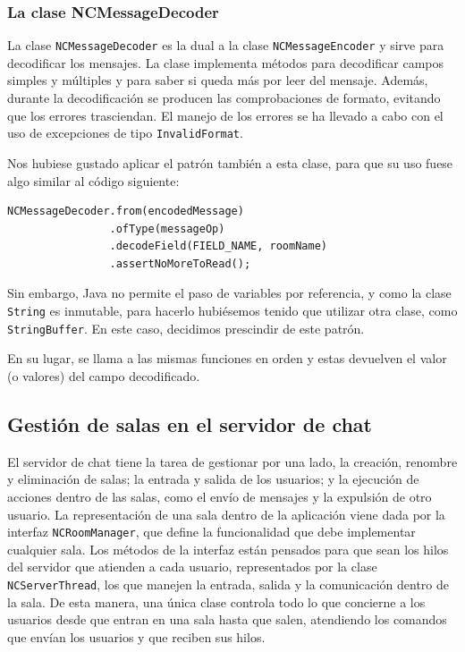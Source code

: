 

\subsubsection*{La clase NCMessageDecoder}
La clase \lstinline!NCMessageDecoder! es la dual a la clase \lstinline!NCMessageEncoder! y sirve para decodificar los mensajes. La clase implementa métodos para decodificar campos simples y múltiples y para saber si queda más por leer del mensaje. Además, durante la decodificación se producen las comprobaciones de formato, evitando que los errores trasciendan. El manejo de los errores se ha llevado a cabo con el uso de excepciones de tipo \lstinline!InvalidFormat!.

Nos hubiese gustado aplicar el patrón  también a esta clase, para que su uso fuese algo similar al código siguiente:

\begin{lstlisting}[style=JavaStyle]
NCMessageDecoder.from(encodedMessage)
                .ofType(messageOp)
                .decodeField(FIELD_NAME, roomName)
                .assertNoMoreToRead();
\end{lstlisting}

Sin embargo, Java no permite el paso de variables por referencia, y como la clase \lstinline!String! es inmutable, para hacerlo hubiésemos tenido que utilizar otra clase, como \lstinline!StringBuffer!. En este caso, decidimos prescindir de este patrón.

En su lugar, se llama a las mismas funciones en orden y estas devuelven el valor (o valores) del campo decodificado.

%

\subsection{Gestión de salas en el servidor de chat}
El servidor de chat tiene la tarea de gestionar por una lado, la creación, renombre y eliminación de salas; la entrada y salida de los usuarios; y la ejecución de acciones dentro de las salas, como el envío de mensajes y la expulsión de otro usuario. La representación de una sala dentro de la aplicación viene dada por la interfaz \lstinline!NCRoomManager!, que define la funcionalidad que debe implementar cualquier sala. Los métodos de la interfaz están pensados para que sean los hilos del servidor que atienden a cada usuario, representados por la clase \lstinline!NCServerThread!, los que manejen la entrada, salida y la comunicación dentro de la sala. De esta manera, una única clase controla todo lo que concierne a los usuarios desde que entran en una sala hasta que salen, atendiendo los comandos que envían los usuarios y que reciben sus hilos.

